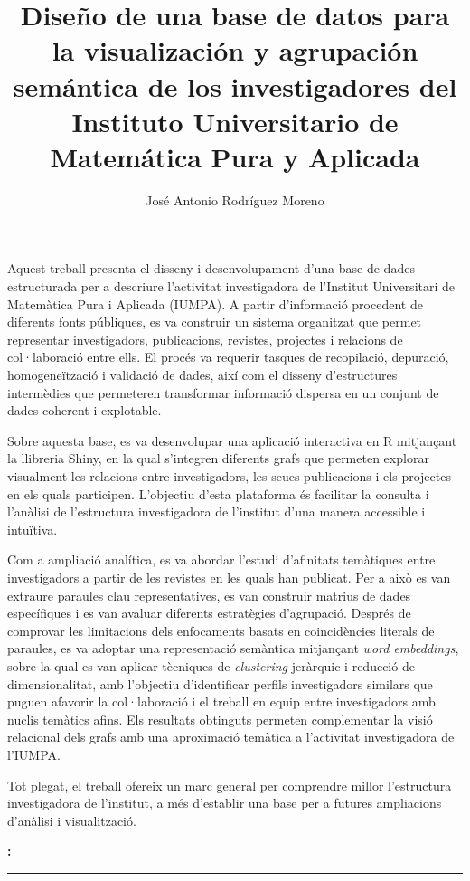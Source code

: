 \documentclass[11pt,spanish,listoffigures,listoftables]{tfgetsinf}
\title{Diseño de una base de datos para la visualización y agrupación semántica de los investigadores del Instituto Universitario de Matemática Pura y Aplicada}
\author{José Antonio Rodríguez Moreno}
\renewenvironment{abstract}[1][catalan]{%
    \begingroup
    \selectlanguage{#1}\vspace{1em}\par\hfill
    {\sffamily\bfseries\Huge\abstractname}\par
    \vspace{0.5em}
}{%
    \par\noindent\textbf{\keywordsname:} \keywords
    \vspace{0.5em}
    \hrule
    \vspace{1em}
    \endgroup
}
\begin{document}

\frontmatter
\thispagestyle{empty}
\null
\clearpage

\begin{abstract}
Aquest treball presenta el disseny i desenvolupament d’una base de dades estructurada per a descriure l’activitat investigadora de l’Institut Universitari de Matemàtica Pura i Aplicada (IUMPA). A partir d’informació procedent de diferents fonts públiques, es va construir un sistema organitzat que permet representar investigadors, publicacions, revistes, projectes i relacions de col·laboració entre ells. El procés va requerir tasques de recopilació, depuració, homogeneïtzació i validació de dades, així com el disseny d’estructures intermèdies que permeteren transformar informació dispersa en un conjunt de dades coherent i explotable.

Sobre aquesta base, es va desenvolupar una aplicació interactiva en R mitjançant la llibreria Shiny, en la qual s’integren diferents grafs que permeten explorar visualment les relacions entre investigadors, les seues publicacions i els projectes en els quals participen. L'objectiu d'esta plataforma és facilitar la consulta i l’anàlisi de l’estructura investigadora de l’institut d’una manera accessible i intuïtiva.

Com a ampliació analítica, es va abordar l'estudi d'afinitats temàtiques entre investigadors a partir de les revistes en les quals han publicat. Per a això es van extraure paraules clau representatives, es van construir matrius de dades específiques i es van avaluar diferents estratègies d’agrupació. Després de comprovar les limitacions dels enfocaments basats en coincidències literals de paraules, es va adoptar una representació semàntica mitjançant \textit{word embeddings}, sobre la qual es van aplicar tècniques de \textit{clustering} jeràrquic i reducció de dimensionalitat, amb l’objectiu d’identificar perfils investigadors similars que puguen afavorir la col·laboració i el treball en equip entre investigadors amb nuclis temàtics afins. Els resultats obtinguts permeten complementar la visió relacional dels grafs amb una aproximació temàtica a l’activitat investigadora de l’IUMPA.

Tot plegat, el treball ofereix un marc general per comprendre millor l'estructura investigadora de l'institut, a més d'establir una base per a futures ampliacions d'anàlisi i visualització.
\end{abstract}
\end{document}
